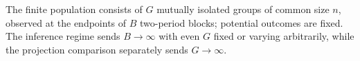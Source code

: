 The finite population consists of \(G\) mutually isolated groups of common size \(n\), observed at the endpoints of \(B\) two-period blocks; potential outcomes are fixed.  The inference regime sends \(B\to\infty\) with even \(G\) fixed or varying arbitrarily, while the projection comparison separately sends \(G\to\infty\).
